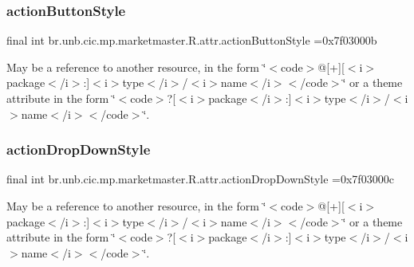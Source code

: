 \subsubsection{\texorpdfstring{action\+Button\+Style}{actionButtonStyle}}
{\footnotesize\ttfamily final int br.\+unb.\+cic.\+mp.\+marketmaster.\+R.\+attr.\+action\+Button\+Style =0x7f03000b\hspace{0.3cm}{\ttfamily [static]}}

May be a reference to another resource, in the form \char`\"{}$<$code$>$@\mbox{[}+\mbox{]}\mbox{[}$<$i$>$package$<$/i$>$\+:\mbox{]}$<$i$>$type$<$/i$>$/$<$i$>$name$<$/i$>$$<$/code$>$\char`\"{} or a theme attribute in the form \char`\"{}$<$code$>$?\mbox{[}$<$i$>$package$<$/i$>$\+:\mbox{]}$<$i$>$type$<$/i$>$/$<$i$>$name$<$/i$>$$<$/code$>$\char`\"{}. \mbox{\label{classbr_1_1unb_1_1cic_1_1mp_1_1marketmaster_1_1R_1_1attr_a59fe8b8efe61690e6b8c0fe9f02952b2}} 
\subsubsection{\texorpdfstring{action\+Drop\+Down\+Style}{actionDropDownStyle}}
{\footnotesize\ttfamily final int br.\+unb.\+cic.\+mp.\+marketmaster.\+R.\+attr.\+action\+Drop\+Down\+Style =0x7f03000c\hspace{0.3cm}{\ttfamily [static]}}

May be a reference to another resource, in the form \char`\"{}$<$code$>$@\mbox{[}+\mbox{]}\mbox{[}$<$i$>$package$<$/i$>$\+:\mbox{]}$<$i$>$type$<$/i$>$/$<$i$>$name$<$/i$>$$<$/code$>$\char`\"{} or a theme attribute in the form \char`\"{}$<$code$>$?\mbox{[}$<$i$>$package$<$/i$>$\+:\mbox{]}$<$i$>$type$<$/i$>$/$<$i$>$name$<$/i$>$$<$/code$>$\char`\"{}. \mbox{\label{classbr_1_1unb_1_1cic_1_1mp_1_1marketmaster_1_1R_1_1attr_a1ad13eb4fe5318fdefff99fb7f9d5f4d}} 
